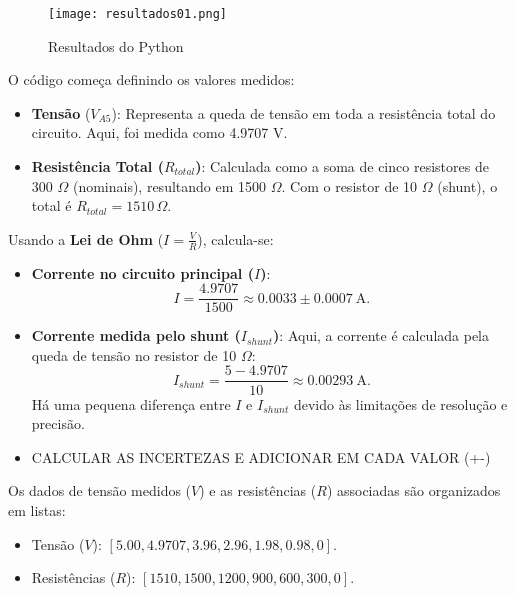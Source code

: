 \documentclass[a4paper,12pt]{article}
\begin{document}
\vspace{1em}

\begin{figure}[H]
    \centering
    \texttt{[image: resultados01.png]} %
    \caption{Resultados do Python}
    \label{fig:tinkercad}
\end{figure}

\vspace{1em}

O código começa definindo os valores medidos:
\begin{itemize}
    \item \textbf{Tensão} ($V_{A5}$): Representa a queda de tensão em toda a resistência total do circuito. Aqui, foi medida como 4.9707 V.
    \item \textbf{Resistência Total ($R_{total}$)}: Calculada como a soma de cinco resistores de 300 $\Omega$ (nominais), resultando em 1500 $\Omega$. Com o resistor de 10 $\Omega$ (shunt), o total é $R_{total} = 1510 \, \Omega$.
\end{itemize}

Usando a \textbf{Lei de Ohm} ($I = \frac{V}{R}$), calcula-se:
\begin{itemize}
    \item \textbf{Corrente no circuito principal ($I$)}:
    \[
    I = \frac{4.9707}{1500} \approx 0.0033\pm0.0007~\text{A}.
    \]
    \item \textbf{Corrente medida pelo shunt ($I_{shunt}$)}: 
    Aqui, a corrente é calculada pela queda de tensão no resistor de 10 $\Omega$:
    \[
    I_{shunt} = \frac{5 - 4.9707}{10} \approx 0.00293~\text{A}.
    \]
    Há uma pequena diferença entre $I$ e $I_{shunt}$ devido às limitações de resolução e precisão.
\end{itemize}

\begin{itemize}
    \item CALCULAR AS INCERTEZAS E ADICIONAR EM CADA VALOR (+-)
\end{itemize}

Os dados de tensão medidos ($V$) e as resistências ($R$) associadas são organizados em listas:
\begin{itemize}
    \item Tensão ($V$): $[5.00, 4.9707, 3.96, 2.96, 1.98, 0.98, 0]$.
    \item Resistências ($R$): $[1510, 1500, 1200, 900, 600, 300, 0]$.
\end{itemize}
\end{document}
